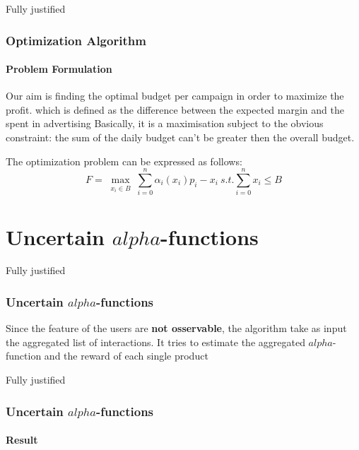 \documentclass{beamer}
\begin{document}
\begin{frame}{Fully justified}

\frametitle{Optimization Algorithm}
\framesubtitle{Problem Formulation}
Our aim is finding the optimal budget per campaign in order to maximize the profit.
which is defined as the difference between the expected margin and the spent in advertising
Basically, it is a maximisation subject to the obvious constraint: the sum of the daily budget can't be greater then the overall budget.

The optimization problem can be expressed as follows:
\begin{displaymath}
F=\max_{\substack{x_i\in B}} \sum_{i=0}^n \alpha_i(x_i)p_i-x_i \ s.t. \sum_{i=0}^n x_i\leq B
\end{displaymath}

\end{frame}


\AtBeginSection[]
{
\begin{frame}{}
    \tableofcontents[currentsection]
\end{frame}
}


\section{Uncertain $alpha$-functions}

\begin {frame}{Fully justified}

\frametitle{Uncertain $alpha$-functions}
Since the feature of the users are \textbf{not osservable}, the algorithm take as input the aggregated list of interactions.
It tries to estimate the aggregated $alpha$-function and the reward of each single product

\end{frame}


\begin {frame}{Fully justified}

\frametitle{Uncertain $alpha$-functions}
\framesubtitle{Result}

\end{frame}

\end{document}
